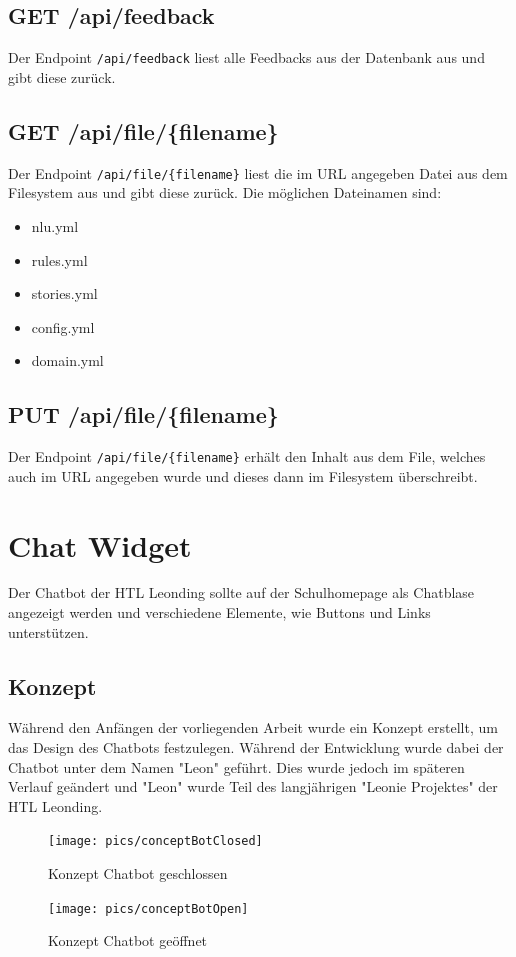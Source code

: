 \subsection{GET /api/feedback}
Der Endpoint \texttt{/api/feedback} liest alle Feedbacks aus der Datenbank aus und gibt diese zurück.

\subsection{GET /api/file/\{filename\}}
Der Endpoint \texttt{/api/file/\{filename\}} liest die im URL angegeben Datei aus dem Filesystem aus und gibt diese zurück.
Die möglichen Dateinamen sind:

\begin{itemize}
    \item nlu.yml
    \item rules.yml
    \item stories.yml
    \item config.yml
    \item domain.yml
\end{itemize}

\subsection{PUT /api/file/\{filename\}}
Der Endpoint \texttt{/api/file/\{filename\}} erhält den Inhalt aus dem File, welches auch im URL angegeben wurde und dieses dann im Filesystem überschreibt.

\section{Chat Widget}\label{sec:chat-widget}
Der Chatbot der HTL Leonding sollte auf der Schulhomepage als Chatblase angezeigt werden und verschiedene Elemente, wie Buttons und Links unterstützen.

\subsection{Konzept}
Während den Anfängen der vorliegenden Arbeit wurde ein Konzept erstellt, um das Design des Chatbots festzulegen.
Während der Entwicklung wurde dabei der Chatbot unter dem Namen "Leon" geführt.
Dies wurde jedoch im späteren Verlauf geändert und "Leon" wurde Teil des langjährigen "Leonie Projektes" der HTL Leonding.

\begin{figure}[hbt!]
    \centering
    \texttt{[image: pics/conceptBotClosed]}
    \caption{Konzept Chatbot geschlossen}
    \label{fig:impl:conceptBotClosed}
\end{figure}
\begin{figure}[hbt!]
    \centering
    \texttt{[image: pics/conceptBotOpen]}
    \caption{Konzept Chatbot geöffnet}
    \label{fig:impl:conceptBotOpen}
\end{figure}

